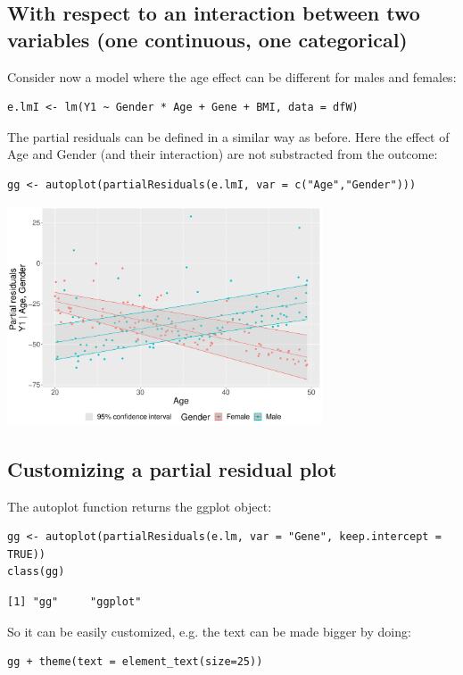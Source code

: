 \documentclass[12pt]{article}
\begin{document}
\subsection{With respect to an interaction between two variables (one continuous, one categorical)}
\label{sec:org9a6e7c2}

Consider now a model where the age effect can be different for males
and females:
\lstset{language=r,label= ,caption= ,captionpos=b,numbers=none}
\begin{lstlisting}
e.lmI <- lm(Y1 ~ Gender * Age + Gene + BMI, data = dfW)
\end{lstlisting}

The partial residuals can be defined in a similar way as before. Here
the effect of Age and Gender (and their interaction) are not
substracted from the outcome:
\lstset{language=r,label= ,caption= ,captionpos=b,numbers=none}
\begin{lstlisting}
gg <- autoplot(partialResiduals(e.lmI, var = c("Age","Gender")))
\end{lstlisting}

\begin{center}
\includegraphics[width=0.7\textwidth]{./figures/fig-butils-plotConf-interaction.pdf}
\end{center}

\subsection{Customizing a partial residual plot}
\label{sec:org24a45c5}

The autoplot function returns the ggplot object:
\lstset{language=r,label= ,caption= ,captionpos=b,numbers=none}
\begin{lstlisting}
gg <- autoplot(partialResiduals(e.lm, var = "Gene", keep.intercept = TRUE))
class(gg)
\end{lstlisting}

\begin{verbatim}
[1] "gg"     "ggplot"
\end{verbatim}

So it can be easily customized, e.g. the text can be made bigger by
doing:
\lstset{language=r,label= ,caption= ,captionpos=b,numbers=none}
\begin{lstlisting}
gg + theme(text = element_text(size=25))
\end{lstlisting}
\end{document}

